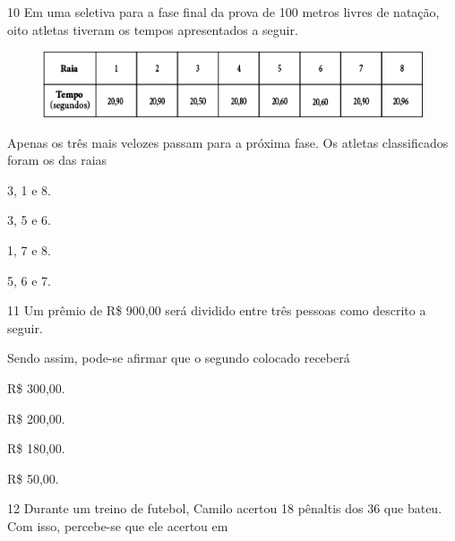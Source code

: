 \num{10} Em uma seletiva para a fase final da prova de 100 metros livres de
natação, oito atletas tiveram os tempos apresentados a seguir.

\begin{figure}[htpb!]
\centering
\includegraphics[width=\textwidth]{media/image86.png}
\end{figure}

Apenas os três mais velozes passam para a próxima fase. Os atletas classificados foram os das raias

\begin{escolha}
\item
  3, 1 e 8.
\item
  3, 5 e 6.
\item
  1, 7 e 8.
\item
  5, 6 e 7.
\end{escolha}


\num{11} Um prêmio de R\$ 900,00 será dividido entre três pessoas como descrito a seguir.


Sendo assim, pode-se afirmar que o segundo colocado receberá

\begin{multicols}{2}
\begin{escolha}
\item
  R\$ 300,00.
\item
  R\$ 200,00.
\item
  R\$ 180,00.
\item
  R\$ 50,00.
\end{escolha}
\end{multicols}

\pagebreak
\num{12} Durante um treino de futebol, Camilo acertou 18 pênaltis dos 36 que
bateu. Com isso, percebe-se que ele acertou em

